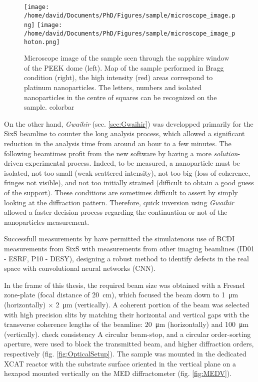 \begin{figure}[!htb]
    \centering
    \texttt{[image: /home/david/Documents/PhD/Figures/sample/microscope\_image.png]}
    \texttt{[image: /home/david/Documents/PhD/Figures/sample/microscope\_image\_photon.png]}
    \caption{
        Microscope image of the sample seen through the sapphire window of the PEEK dome (left).
        Map of the sample performed in Bragg condition (right), the high intensity (red) areas correspond to platinum nanoparticles.
        The letters, numbers and isolated nanoparticles in the centre of squares can be recognized on the sample.
        \textcolor{Important}{colorbar}
    }
    \label{fig:SampleMapping}
\end{figure}

On the other hand, \textit{Gwaihir} (sec. \ref{sec:Gwaihir}) was developped primarily for the SixS beamline to counter the long analysis process, which allowed a significant reduction in the analysis time from around an hour to a few minutes.
The following beamtimes profit from the new software by having a more \textit{solution}-driven experimental process.
Indeed, to be measured, a nanoparticle must be isolated, not too small (weak scattered intensity), not too big (loss of coherence, fringes not visible), and not too initially strained (difficult to obtain a good guess of the support).
These conditions are sometimes difficult to assert by simply looking at the diffraction pattern.
Therefore, quick inversion using \textit{Gwaihir} allowed a faster decision process regarding the continuation or not of the nanoparticles measurement.

Successfull measurements by \cite{Lim2021} have permitted the simulatenous use of BCDI measurements from SixS with measurements from other imaging beamlines (ID01 - ESRF, P10 - DESY), designing a robust method to identify defects in the real space with convolutional neural networks (CNN).

In the frame of this thesis, the required beam size was obtained with a Fresnel zone-plate (focal distance of \qty{20}{\cm}), which focused the beam down to \qty{1}{\um} (horizontally) $\times$ \qty{2}{\um} (vertically).
A coherent portion of the beam was selected with high precision slits by matching their horizontal and vertical gaps with the transverse coherence lengths of the beamline: \qty{20}{\um} (horizontally) and \qty{100}{\um} (vertically).
\textcolor{Important}{check consistency}
A circular beam-stop, and a circular order-sorting aperture, were used to block the transmitted beam, and higher diffraction orders, respectively (fig. \ref{fig:OpticalSetup}).
The sample was mounted in the dedicated XCAT reactor with the substrate surface oriented in the vertical plane on a hexapod mounted vertically on the MED diffractometer (fig. \ref{fig:MEDV}).

